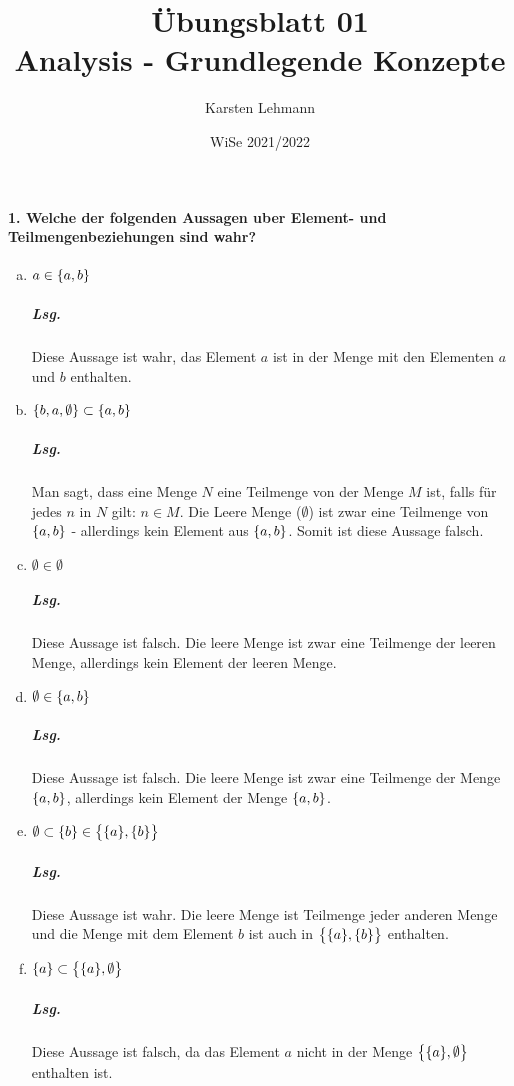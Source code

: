 \documentclass{scrreprt}
\author{Karsten Lehmann}
\date{WiSe 2021/2022}
\title{Übungsblatt 01\\Analysis - Grundlegende Konzepte}
\begin{document}
\paragraph{1. Welche der folgenden Aussagen uber Element- und Teilmengenbeziehungen sind wahr?}

\begin{enumerate}[a)]
\item $a \in \qty{a, b}$

  \subparagraph{Lsg.} Diese Aussage ist wahr, das Element $a$ ist in der Menge
  mit den Elementen $a$ und $b$ enthalten.

\item $\qty{b, a, \emptyset} \subset \qty{a, b}$

  \subparagraph{Lsg.} Man sagt, dass eine Menge $N$ eine Teilmenge von der Menge
  $M$ ist, falls für jedes $n$ in $N$ gilt: $n \in M$.
  Die Leere Menge ($\emptyset$) ist zwar eine Teilmenge von $\qty{a, b}$ -
  allerdings kein Element aus $\qty{a, b}$.
  Somit ist diese Aussage falsch.

\item $\emptyset \in \emptyset$

  \subparagraph{Lsg.} Diese Aussage ist falsch.
  Die leere Menge ist zwar eine Teilmenge der leeren Menge, allerdings kein
  Element der leeren Menge.

\item $\emptyset \in \qty{a, b}$

  \subparagraph{Lsg.} Diese Aussage ist falsch.
  Die leere Menge ist zwar eine Teilmenge der Menge $\qty{a, b}$, allerdings kein
  Element der Menge $\qty{a, b}$.

\item $\emptyset \subset \qty{b} \in \qty\big{\qty{a}, \qty{b}}$

  \subparagraph{Lsg.} Diese Aussage ist wahr.
  Die leere Menge ist Teilmenge jeder anderen Menge und die Menge mit dem
  Element $b$ ist auch in $\qty\big{\qty{a}, \qty{b}}$ enthalten.

\item $\qty{a} \subset \qty\big{\qty{a}, \emptyset}$

  \subparagraph{Lsg.} Diese Aussage ist falsch, da das Element $a$ nicht in
  der Menge $\qty\big{\qty{a}, \emptyset}$ enthalten ist.
\end{enumerate}
\end{document}
